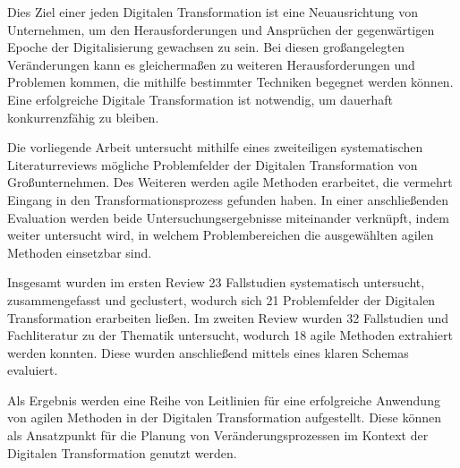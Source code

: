 
Dies Ziel einer jeden Digitalen Transformation ist eine Neuausrichtung von Unternehmen, um den Herausforderungen und Ansprüchen der gegenwärtigen Epoche der Digitalisierung gewachsen zu sein. Bei diesen großangelegten Veränderungen kann es gleichermaßen zu weiteren Herausforderungen und Problemen kommen, die mithilfe bestimmter Techniken begegnet werden können. Eine erfolgreiche Digitale Transformation ist notwendig, um dauerhaft konkurrenzfähig zu bleiben. 

Die vorliegende Arbeit untersucht mithilfe eines zweiteiligen systematischen Literaturreviews mögliche Problemfelder der Digitalen Transformation von Großunternehmen. Des Weiteren werden agile Methoden erarbeitet, die vermehrt Eingang in den Transformationsprozess gefunden haben. In einer anschließenden Evaluation werden beide Untersuchungsergebnisse miteinander verknüpft, indem weiter untersucht wird, in welchem Problembereichen die ausgewählten agilen Methoden einsetzbar sind.

Insgesamt wurden im ersten Review 23 Fallstudien systematisch untersucht, zusammengefasst und geclustert, wodurch sich 21 Problemfelder der Digitalen Transformation erarbeiten ließen. Im zweiten Review wurden 32 Fallstudien und Fachliteratur zu der Thematik untersucht, wodurch 18 agile Methoden extrahiert werden konnten. Diese wurden anschließend mittels eines klaren Schemas evaluiert.

Als Ergebnis werden eine Reihe von Leitlinien für eine erfolgreiche Anwendung von agilen Methoden in der Digitalen Transformation aufgestellt. Diese können als Ansatzpunkt für die Planung von Veränderungsprozessen im Kontext der Digitalen Transformation genutzt werden.

